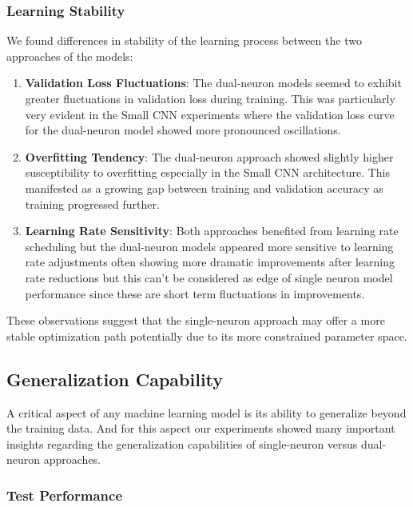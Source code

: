 \subsubsection{Learning Stability}

We found differences in stability of the learning process between the two approaches of the models:

\begin{enumerate}
\item \textbf{Validation Loss Fluctuations}: The dual-neuron models seemed to exhibit greater fluctuations in validation loss during training. This was particularly very evident in the Small CNN experiments where the validation loss curve for the dual-neuron model showed more pronounced oscillations.

\item \textbf{Overfitting Tendency}: The dual-neuron approach showed slightly higher susceptibility to overfitting especially in the Small CNN architecture. This manifested as a growing gap between training and validation accuracy as training progressed further.

\item \textbf{Learning Rate Sensitivity}: Both approaches benefited from learning rate scheduling but the dual-neuron models appeared more sensitive to learning rate adjustments often showing more dramatic improvements after learning rate reductions but this can't be considered as edge of single neuron model performance since these are short term fluctuations in improvements.
\end{enumerate}

These observations suggest that the single-neuron approach may offer a more stable optimization path potentially due to its more constrained parameter space.

\subsection{Generalization Capability}

A critical aspect of any machine learning model is its ability to generalize beyond the training data. And for this aspect our experiments showed many important insights regarding the generalization capabilities of single-neuron versus dual-neuron approaches.

\subsubsection{Test Performance}

